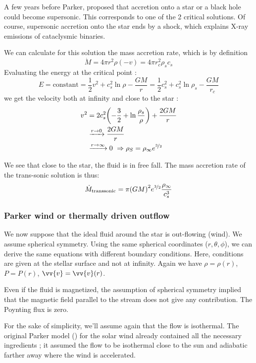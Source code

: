 \documentclass[10pt,a4paper,english]{article}
\let\originalleft\left
\let\originalright\right
\renewcommand{\left}{\mathopen{}\mathclose\bgroup\originalleft}
\renewcommand{\right}{\aftergroup\egroup\originalright}
\begin{document}
A few years before Parker, \cite{1952MNRAS.112..195B} proposed that accretion onto a
star or a black hole could become supersonic. This corresponds to one
of the 2 critical solutions. Of course, supersonic accretion onto the
star ends by a shock, which explains X-ray emissions of cataclysmic
binaries.

We can calculate for this solution the mass accretion rate, which is
by definition
\begin{equation}
  \dot{M} = 4\pi r^2 \rho (-v) = 4\pi r_c^2 \rho_s c_s
\end{equation}
Evaluating the energy at the critical point :
\begin{equation}
  E = \textrm{constant} = \frac{1}{2}v^2 + c_s^2 \ln\rho - \frac{GM}{r} = \frac{1}{2}c_s^2 + c_s^2 \ln \rho_s - \frac{GM}{r_c}
\end{equation}
we get the velocity both at infinity and close to the star :
\begin{align}
  v^2 &= 2c_s^2 \left( -\frac{3}{2} + \ln \frac{\rho_s}{\rho} \right)  + \frac{2GM}{r} \\
      & \xrightarrow{r\to 0} \frac{2GM}{r} \\
      & \xrightarrow{r\to\infty} 0\ \Rightarrow \rho_S = \rho_\infty e^{\nicefrac{3}{2}}
\end{align}

We see that close to the star, the fluid is in free fall. The mass
accretion rate of the trans-sonic solution is thus:
\begin{equation}
  \dot{M}_\mathrm{transsonic} = \pi \left( GM \right)^2 e^{\nicefrac{3}{2}} \frac{\rho_\infty}{c_s^3}
\end{equation}
\subsubsection{Parker wind or thermally driven outflow}
We now suppose that the ideal fluid around the star is out-flowing (wind). We assume spherical symmetry. Using the same spherical coordinates ($r, \theta, \phi$), we can derive the same equations with different boundary conditions. Here, conditions are given at the stellar surface and not at infinity. Again we have $\rho = \rho(r)$, $P = P(r)$, $\vv{v} = \vv{v}(r)$.

Even if the fluid is magnetized, the assumption of spherical symmetry implied that the magnetic field parallel to the stream does not give any contribution. The Poynting flux is zero.

For the sake of simplicity, we'll assume again that the flow is isothermal. The original Parker model (\cite{1958ApJ...128..664P}) for the solar wind already contained all the necessary ingredients ; it assumed the flow to be isothermal close to the sun and adiabatic farther away where the wind is accelerated.
\end{document}
